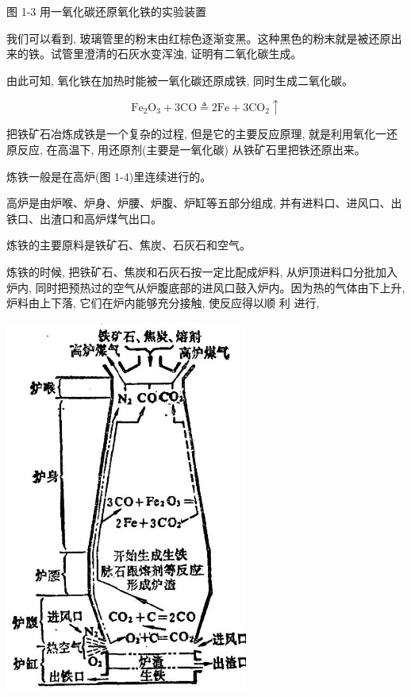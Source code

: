 \documentclass[10pt]{article}
\begin{document}
图 1-3 用一氧化碳还原氧化铁的实验装置

我们可以看到, 玻璃管里的粉末由红棕色逐渐变黑。这种黑色的粉末就是被还原出来的铁。试管里澄清的石灰水变浑浊, 证明有二氧化碳生成。

由此可知, 氧化铁在加热时能被一氧化碳还原成铁, 同时生成二氧化碳。

\[
{\mathrm{{Fe}}}_{2}{\mathrm{O}}_{3} + 3\mathrm{{CO}} \triangleq 2\mathrm{{Fe}} + 3{\mathrm{{CO}}}_{2} \uparrow
\]

把铁矿石冶炼成铁是一个复杂的过程, 但是它的主要反应原理, 就是利用氧化一还原反应, 在高温下, 用还原剂(主要是一氧化碳) 从铁矿石里把铁还原出来。

炼铁一般是在高炉(图 1-4)里连续进行的。

高炉是由炉喉、炉身、炉腰、炉腹、炉缸等五部分组成, 并有进料口、进风口、出铁口、出渣口和高炉煤气出口。

炼铁的主要原料是铁矿石、焦炭、石灰石和空气。

炼铁的时候, 把铁矿石、焦炭和石灰石按一定比配成炉料, 从炉顶进料口分批加入炉内, 同时把预热过的空气从炉腹底部的进风口鼓入炉内。因为热的气体由下上升, 炉料由上下落, 它们在炉内能够充分接触, 使反应得以顺 利 进行,

\begin{center}
\includegraphics[max width=0.6\textwidth]{images/01912d16-be99-77bb-9535-4f3ed8d9946f_29_811543.jpg}
\end{center}
\end{document}
